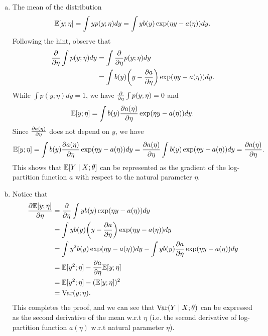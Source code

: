\documentclass[12pt,letterpaper,boxed]{hmcpset}
\begin{document}
\begin{solution}
  \begin{enumerate}[(a)]
    \item The mean of the distribution
    \[
    \mathbb{E}[y; \eta] = \int y p(y ; \eta) dy = \int y b(y) \exp(\eta y - a(\eta)) dy.
    \]
    Following the hint, observe that
    \[
    \begin{aligned}
      \pd{\eta} \int p(y;\eta) dy &= \int \pd{\eta} p(y ; \eta) dy \\ 
      &= \int b(y) \qty(y - \pdv{a}{\eta}) \exp(\eta y - a(\eta)) dy.
    \end{aligned}
    \]
    While $\int p(y; \eta) dy = 1$, we have $\pd{\eta} \int p(y; \eta) = 0$ and 
    \[
    \mathbb{E}[y ; \eta] = \int b(y) \pdv{a(\eta)}{\eta} \exp(\eta y - a(\eta)) dy.
    \]
    Since $\pdv{a(\eta)}{\eta}$ does not depend on $y$, we have
    \[
    \mathbb{E}[y ;\eta] = \int b(y) \pdv{a(\eta)}{\eta} \exp(\eta y - a(\eta)) dy = \pdv{a(\eta)}{\eta} \int b(y) \exp(\eta y - a(\eta)) dy = \pdv{a(\eta)}{\eta}.
    \]
    This shows that $\mathbb{E}[Y \mid X; \theta]$ can be represented as the gradient of the log-partition function $a$ with respect to the natural parameter $\eta$.

    \item Notice that
    \[
    \begin{aligned}
      \pdv{\E[y; \eta]}{\eta} &= 
      \pd{\eta} \int y b(y) \exp(\eta y - a(\eta)) dy \\
      &= \int y b(y) \qty(y - \pdv{a}{\eta}) \exp(\eta y - a(\eta)) dy \\
      &= \int y^2 b(y) \exp(\eta y - a(\eta)) dy - \int y b(y) \pdv{a}{\eta} \exp(\eta y - a(\eta)) dy \\
      &= \E[y^2; \eta] - \pdv{a}{\eta} \E[y; \eta] \\
      &= \E[y^2; \eta] - (\E[y; \eta])^2 \\
      &= \Var(y; \eta).
    \end{aligned}
    \]
    This completes the proof, and we can see that $\operatorname{Var}(Y \mid X ; \theta)$ can be expressed as the second derivative of the mean w.r.t $\eta$ (i.e. the second derivative of log-partition function $a(\eta)$ w.r.t natural parameter $\eta$).


\end{enumerate}
\end{solution}
\end{document}
